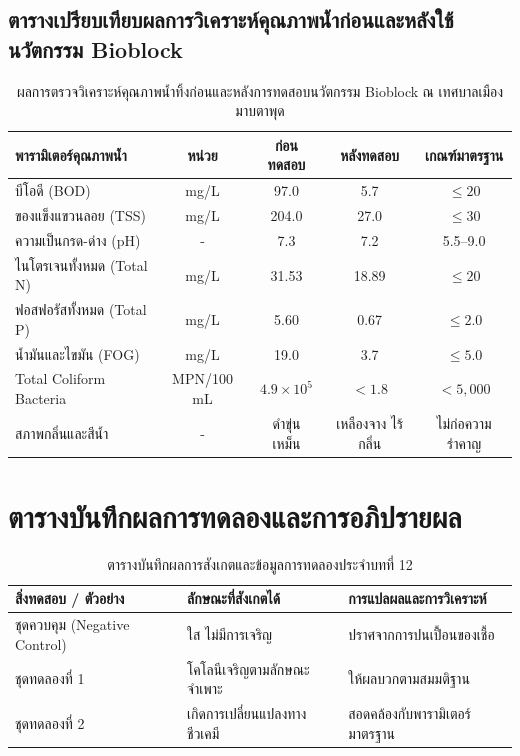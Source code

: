 \subsection{ตารางเปรียบเทียบผลการวิเคราะห์คุณภาพน้ำก่อนและหลังใช้นวัตกรรม Bioblock}
\begin{table}[H]
\centering\small
\caption{ผลการตรวจวิเคราะห์คุณภาพน้ำทิ้งก่อนและหลังการทดสอบนวัตกรรม Bioblock ณ เทศบาลเมืองมาบตาพุด}
\label{tab:bioblock_results}
\begin{tabularx}{\textwidth}{p{} c c c c}
\toprule
\textbf{พารามิเตอร์คุณภาพน้ำ} & \textbf{หน่วย} & \textbf{ก่อนทดสอบ} & \textbf{หลังทดสอบ} & \textbf{เกณฑ์มาตรฐาน} \\
\midrule
บีโอดี (BOD) & mg/L & 97.0 & 5.7 & $\le 20$ \\
ของแข็งแขวนลอย (TSS) & mg/L & 204.0 & 27.0 & $\le 30$ \\
ความเป็นกรด-ด่าง (pH) & - & 7.3 & 7.2 & 5.5--9.0 \\
ไนโตรเจนทั้งหมด (Total N) & mg/L & 31.53 & 18.89 & $\le 20$ \\
ฟอสฟอรัสทั้งหมด (Total P) & mg/L & 5.60 & 0.67 & $\le 2.0$ \\
น้ำมันและไขมัน (FOG) & mg/L & 19.0 & 3.7 & $\le 5.0$ \\
Total Coliform Bacteria & MPN/100 mL & $4.9\times 10^5$ & $<1.8$ & $<5,000$ \\
สภาพกลิ่นและสีน้ำ & - & ดำขุ่น เหม็น & เหลืองจาง ไร้กลิ่น & ไม่ก่อความรำคาญ \\
\bottomrule
\end{tabularx}
\end{table}

\section{ตารางบันทึกผลการทดลองและการอภิปรายผล}
\begin{table}[H]
\centering\small
\caption{ตารางบันทึกผลการสังเกตและข้อมูลการทดลองประจำบทที่ 12}
\label{tab:ch12_datasheet}
\begin{tabularx}{\textwidth}{p{} p{} X}
\toprule
\textbf{สิ่งทดสอบ / ตัวอย่าง} & \textbf{ลักษณะที่สังเกตได้} & \textbf{การแปลผลและการวิเคราะห์} \\
\midrule
ชุดควบคุม (Negative Control) & ใส ไม่มีการเจริญ & ปราศจากการปนเปื้อนของเชื้อ \\
ชุดทดลองที่ 1 & โคโลนีเจริญตามลักษณะจำเพาะ & ให้ผลบวกตามสมมติฐาน \\
ชุดทดลองที่ 2 & เกิดการเปลี่ยนแปลงทางชีวเคมี & สอดคล้องกับพารามิเตอร์มาตรฐาน \\
\bottomrule
\end{tabularx}
\end{table}

